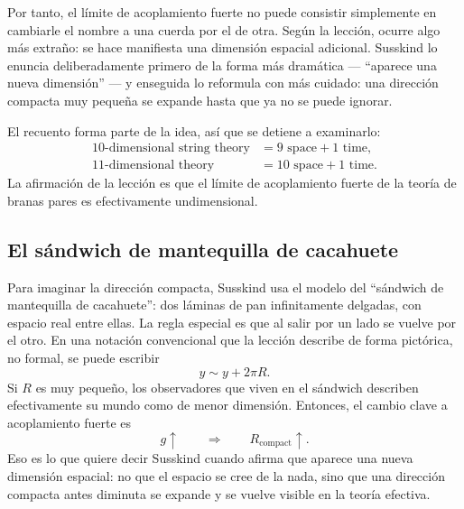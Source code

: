 Por tanto, el límite de acoplamiento fuerte no puede consistir simplemente en cambiarle el nombre a una cuerda por el de otra. Según la lección, ocurre algo más extraño: se hace manifiesta una dimensión espacial adicional. Susskind lo enuncia deliberadamente primero de la forma más dramática --- ``aparece una nueva dimensión'' --- y enseguida lo reformula con más cuidado: una dirección compacta muy pequeña se expande hasta que ya no se puede ignorar.

El recuento forma parte de la idea, así que se detiene a examinarlo:
\begin{equation}
\begin{aligned}
10\text{-dimensional string theory} &= 9\text{ space}+1\text{ time},\\
11\text{-dimensional theory} &= 10\text{ space}+1\text{ time}.
\end{aligned}
\end{equation}
La afirmación de la lección es que el límite de acoplamiento fuerte de la teoría de branas pares es efectivamente undimensional.


\subsection{El sándwich de mantequilla de cacahuete}

Para imaginar la dirección compacta, Susskind usa el modelo del ``sándwich de mantequilla de cacahuete'': dos láminas de pan infinitamente delgadas, con espacio real entre ellas. La regla especial es que al salir por un lado se vuelve por el otro. En una notación convencional que la lección describe de forma pictórica, no formal, se puede escribir
\begin{equation}
y \sim y + 2\pi R.
\end{equation}
Si \(R\) es muy pequeño, los observadores que viven en el sándwich describen efectivamente su mundo como de menor dimensión. Entonces, el cambio clave a acoplamiento fuerte es
\begin{equation}
g\uparrow
\qquad \Longrightarrow \qquad
R_{\mathrm{compact}}\uparrow.
\end{equation}
Eso es lo que quiere decir Susskind cuando afirma que aparece una nueva dimensión espacial: no que el espacio se cree de la nada, sino que una dirección compacta antes diminuta se expande y se vuelve visible en la teoría efectiva.

